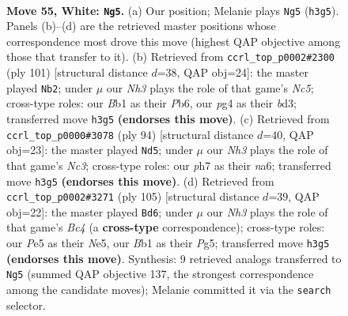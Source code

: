 \documentclass[11pt]{article}
\begin{document}
\clearpage

\begin{figure}[p]\centering
\begin{subfigure}{0.46\textwidth}\centering
\resizebox{\linewidth}{!}{%
\newchessgame
\chessboard[
  setfen={6k1/2r2p1p/b5p1/4P3/1n3Pp1/7N/5K1P/1B6 w - - 0 55},
  showmover=false,
  pgfstyle=straightmove, color=movearrow, markmove={h3-g5}
]}
\caption{}
\end{subfigure}\hfill
\begin{subfigure}{0.46\textwidth}\centering
\resizebox{\linewidth}{!}{%
\newchessgame
\chessboard[
  setfen={8/p7/1p6/1P2k1p1/P1n3P1/3B1PK1/8/8 b - - 1 51},
  showmover=false,
  pgfstyle=straightmove, color=movearrow, markmove={c4-b2}
]}
\caption{}
\end{subfigure}
\\[4pt]
\begin{subfigure}{0.46\textwidth}\centering
\resizebox{\linewidth}{!}{%
\newchessgame
\chessboard[
  setfen={8/5p2/n2Bn1k1/6p1/1p6/2N2P1P/4K1P1/8 w - - 0 48},
  showmover=false,
  pgfstyle=straightmove, color=movearrow, markmove={c3-d5}
]}
\caption{}
\end{subfigure}\hfill
\begin{subfigure}{0.46\textwidth}\centering
\resizebox{\linewidth}{!}{%
\newchessgame
\chessboard[
  setfen={8/5k2/1p5p/2b1n1p1/1P4P1/P5PK/6R1/8 b - - 0 53},
  showmover=false,
  pgfstyle=straightmove, color=movearrow, markmove={c5-d6}
]}
\caption{}
\end{subfigure}
\caption{\textbf{Move 55, White: \texttt{Ng5}.} (a) Our position; Melanie plays \texttt{Ng5} (\texttt{h3g5}). Panels (b)--(d) are the retrieved master positions whose correspondence most drove this move (highest QAP objective among those that transfer to it). (b) Retrieved from \texttt{ccrl\_top\_p0002\#2300} (ply 101) [structural distance $d$=38, QAP obj=24]: the master played \texttt{Nb2}; under $\mu$ our \emph{Nh3} plays the role of that game's \emph{Nc5}; cross-type roles: our \emph{B}b1 as their \emph{P}b6, our \emph{p}g4 as their \emph{b}d3; transferred move \texttt{h3g5} \textbf{(endorses this move)}. (c) Retrieved from \texttt{ccrl\_top\_p0000\#3078} (ply 94) [structural distance $d$=40, QAP obj=23]: the master played \texttt{Nd5}; under $\mu$ our \emph{Nh3} plays the role of that game's \emph{Nc3}; cross-type roles: our \emph{p}h7 as their \emph{n}a6; transferred move \texttt{h3g5} \textbf{(endorses this move)}. (d) Retrieved from \texttt{ccrl\_top\_p0002\#3271} (ply 105) [structural distance $d$=39, QAP obj=22]: the master played \texttt{Bd6}; under $\mu$ our \emph{Nh3} plays the role of that game's \emph{Bc4} (a \textbf{cross-type} correspondence); cross-type roles: our \emph{P}e5 as their \emph{N}e5, our \emph{B}b1 as their \emph{P}g5; transferred move \texttt{h3g5} \textbf{(endorses this move)}. Synthesis: 9 retrieved analogs transferred to \texttt{Ng5} (summed QAP objective 137, the strongest correspondence among the candidate moves); Melanie committed it via the \texttt{search} selector.}
\label{fig:thought-m108}
\end{figure}
\end{document}
